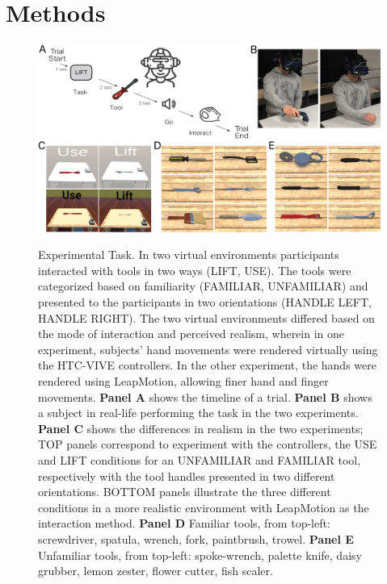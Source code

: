 \section{Methods}

\begin{figure}[!h]
    \centering
    \includegraphics[width=1\linewidth]{source/figures/setup/Methods_1.png} \\
    \caption[]{Experimental Task. In two virtual environments participants interacted with tools in two ways (LIFT, USE). The tools were categorized based on familiarity (FAMILIAR, UNFAMILIAR) and presented to the participants in two orientations (HANDLE LEFT, HANDLE RIGHT). The two virtual environments differed based on the mode of interaction and perceived realism, wherein in one experiment, subjects’ hand movements were rendered virtually using the HTC-VIVE controllers. In the other experiment, the hands were rendered using LeapMotion, allowing finer hand and finger movements. \textbf{Panel A} shows the timeline of a trial. \textbf{Panel B} shows a subject in real-life performing the task in the two experiments. \textbf{Panel C} shows the differences in realism in the two experiments; TOP panels correspond to experiment with the controllers, the USE and LIFT conditions for an UNFAMILIAR and FAMILIAR tool, respectively with the tool handles presented in two different orientations. BOTTOM panels illustrate the three different conditions in a more realistic environment with LeapMotion as the interaction method. \textbf{Panel D} Familiar tools, from top-left: screwdriver, spatula, wrench, fork, paintbrush, trowel. \textbf{Panel E} Unfamiliar tools, from top-left: spoke-wrench, palette knife, daisy grubber, lemon zester, flower cutter, fish scaler.
    }
    \label{figure:task}
\end{figure}

